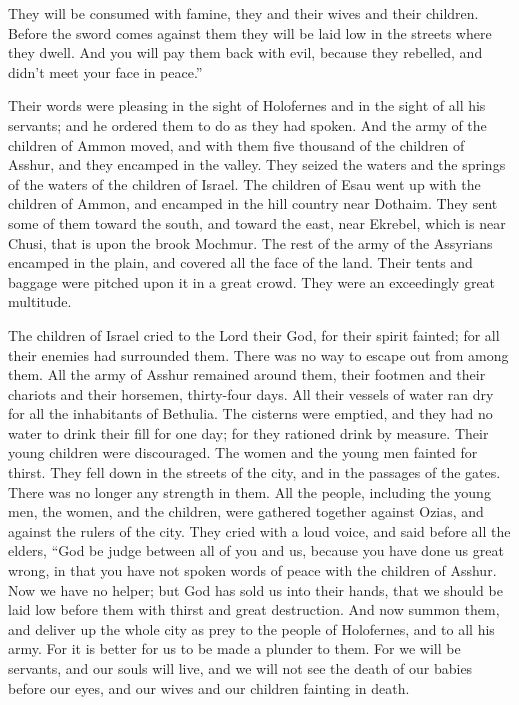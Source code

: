 {They will be consumed with famine, they and their wives and their children. Before the sword comes against them they will be laid low in the streets where they dwell.
And you will pay them back with evil, because they rebelled, and didn’t meet your face in peace.”
\par }{\PP {}Their words were pleasing in the sight of Holofernes and in the sight of all his servants; and he ordered them to do as they had spoken.
And the army of the children of Ammon moved, and with them five thousand of the children of Asshur, and they encamped in the valley. They seized the waters and the springs of the waters of the children of Israel.
The children of Esau went up with the children of Ammon, and encamped in the hill country near Dothaim. They sent some of them toward the south, and toward the east, near Ekrebel, which is near Chusi, that is upon the brook Mochmur. The rest of the army of the Assyrians encamped in the plain, and covered all the face of the land. Their tents and baggage were pitched upon it in a great crowd. They were an exceedingly great multitude.
\par }{\PP {}The children of Israel cried to the Lord their God, for their spirit fainted; for all their enemies had surrounded them. There was no way to escape out from among them.
All the army of Asshur remained around them, their footmen and their chariots and their horsemen, thirty-four days. All their vessels of water ran dry for all the inhabitants of Bethulia.
The cisterns were emptied, and they had no water to drink their fill for one day; for they rationed drink by measure.
Their young children were discouraged. The women and the young men fainted for thirst. They fell down in the streets of the city, and in the passages of the gates. There was no longer any strength in them.
All the people, including the young men, the women, and the children, were gathered together against Ozias, and against the rulers of the city. They cried with a loud voice, and said before all the elders,
“God be judge between all of you and us, because you have done us great wrong, in that you have not spoken words of peace with the children of Asshur.
Now we have no helper; but God has sold us into their hands, that we should be laid low before them with thirst and great destruction.
And now summon them, and deliver up the whole city as prey to the people of Holofernes, and to all his army.
For it is better for us to be made a plunder to them. For we will be servants, and our souls will live, and we will not see the death of our babies before our eyes, and our wives and our children fainting in death.
}

